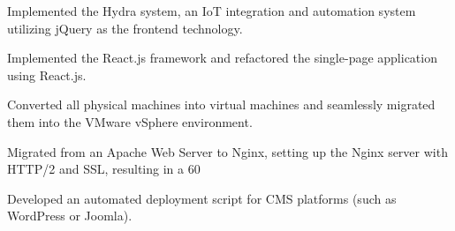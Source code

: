 \documentclass[]{deedy-resume-openfont}
\begin{document}
\begin{minipage}[t]{1\textwidth}
\null\hfill{}
\begin{tightemize}
    \item Implemented the Hydra system, an IoT integration and automation system utilizing jQuery as the frontend technology.
    \item Implemented the React.js framework and refactored the single-page application using React.js.
\end{tightemize}
\sectionsep

\null\hfill{}
\begin{tightemize}
    \item Converted all physical machines into virtual machines and seamlessly migrated them into the VMware vSphere environment.
    \item Migrated from an Apache Web Server to Nginx, setting up the Nginx server with HTTP/2 and SSL, resulting in a 60%
    \item Developed an automated deployment script for CMS platforms (such as WordPress or Joomla).
\end{tightemize}



\end{minipage}
%
%
\end{document}
